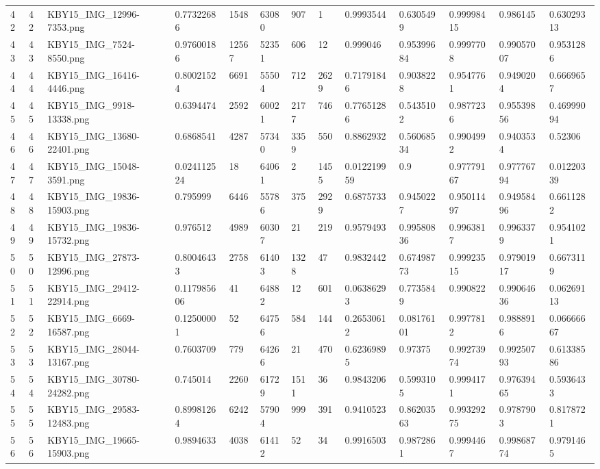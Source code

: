 \documentclass[11pt, a4paper, twoside]{report}
\begin{document}
\begin{longtable}[c]{@{}lllllllllllll@{}}
42 & 42 & KBY15\_IMG\_12996-7353.png & 0.77322686 & 1548 & 63080 & 907 & 1 & 0.9993544 & 0.6305499 & 0.99998415 & 0.986145 & 0.63029313 \\
43 & 43 & KBY15\_IMG\_7524-8550.png & 0.97600186 & 12567 & 52351 & 606 & 12 & 0.999046 & 0.95399684 & 0.9997708 & 0.99057007 & 0.9531286 \\
44 & 44 & KBY15\_IMG\_16416-4446.png & 0.80021524 & 6691 & 55504 & 712 & 2629 & 0.71791846 & 0.9038228 & 0.9547761 & 0.9490204 & 0.6669657 \\
45 & 45 & KBY15\_IMG\_9918-13338.png & 0.6394474 & 2592 & 60021 & 2177 & 746 & 0.77651286 & 0.5435102 & 0.9877236 & 0.95539856 & 0.46999094 \\
46 & 46 & KBY15\_IMG\_13680-22401.png & 0.6868541 & 4287 & 57340 & 3359 & 550 & 0.8862932 & 0.56068534 & 0.9904992 & 0.9403534 & 0.52306 \\
47 & 47 & KBY15\_IMG\_15048-3591.png & 0.024112524 & 18 & 64061 & 2 & 1455 & 0.012219959 & 0.9 & 0.97779167 & 0.97776794 & 0.01220339 \\
48 & 48 & KBY15\_IMG\_19836-15903.png & 0.795999 & 6446 & 55786 & 375 & 2929 & 0.6875733 & 0.9450227 & 0.95011497 & 0.94958496 & 0.6611282 \\
49 & 49 & KBY15\_IMG\_19836-15732.png & 0.976512 & 4989 & 60307 & 21 & 219 & 0.9579493 & 0.99580836 & 0.9963817 & 0.9963379 & 0.9541021 \\
50 & 50 & KBY15\_IMG\_27873-12996.png & 0.80046433 & 2758 & 61403 & 1328 & 47 & 0.9832442 & 0.67498773 & 0.99923515 & 0.97901917 & 0.6673119 \\
51 & 51 & KBY15\_IMG\_29412-22914.png & 0.117985606 & 41 & 64882 & 12 & 601 & 0.06386293 & 0.7735849 & 0.990822 & 0.99064636 & 0.06269113 \\
52 & 52 & KBY15\_IMG\_6669-16587.png & 0.12500001 & 52 & 64756 & 584 & 144 & 0.26530612 & 0.08176101 & 0.9977812 & 0.9888916 & 0.06666667 \\
53 & 53 & KBY15\_IMG\_28044-13167.png & 0.7603709 & 779 & 64266 & 21 & 470 & 0.62369895 & 0.97375 & 0.99273974 & 0.99250793 & 0.61338586 \\
54 & 54 & KBY15\_IMG\_30780-24282.png & 0.745014 & 2260 & 61729 & 1511 & 36 & 0.9843206 & 0.5993105 & 0.9994171 & 0.97639465 & 0.5936433 \\
55 & 55 & KBY15\_IMG\_29583-12483.png & 0.89981264 & 6242 & 57904 & 999 & 391 & 0.9410523 & 0.86203563 & 0.99329275 & 0.9787903 & 0.8178721 \\
56 & 56 & KBY15\_IMG\_19665-15903.png & 0.9894633 & 4038 & 61412 & 52 & 34 & 0.9916503 & 0.9872861 & 0.9994467 & 0.99868774 & 0.9791465 \\

\end{longtable}
\end{document}
